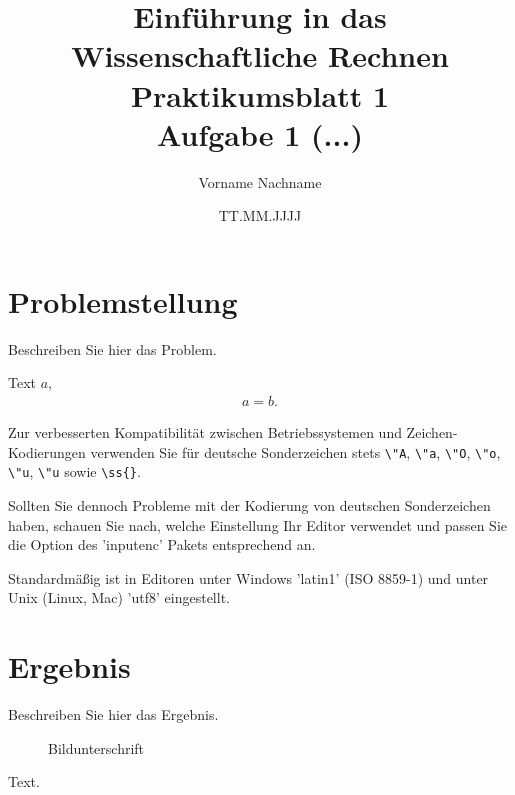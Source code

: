 \documentclass[11pt,a4paper]{article}
\title{Einf\"uhrung in das Wissenschaftliche Rechnen\\
  Praktikumsblatt 1\\
  Aufgabe 1 (...)}
\author{Vorname Nachname}
\date{TT.MM.JJJJ}
\begin{document}
  
  \maketitle
  
  \section*{Problemstellung}
  Beschreiben Sie hier das Problem.
  
  Text $a$,
  \begin{align*}
    a = b.
  \end{align*}
  
  Zur verbesserten Kompatibilit\"at zwischen Betriebssystemen und
  Zeichen-Kodierungen verwenden Sie f\"ur deutsche Sonderzeichen stets
  \verb+\"A+, \verb+\"a+, \verb+\"O+, \verb+\"o+, \verb+\"u+, \verb+\"u+
  sowie \verb+\ss{}+.
  
  Sollten Sie dennoch Probleme mit der Kodierung von deutschen Sonderzeichen
  haben, schauen Sie nach, welche Einstellung Ihr Editor verwendet und passen
  Sie die Option des 'inputenc' Pakets entsprechend an.
  
  Standardm\"a\ss{}ig ist in Editoren unter Windows 'latin1' (ISO 8859-1) und
  unter Unix (Linux, Mac) 'utf8' eingestellt.
  
  
  
  \section*{Ergebnis}
  
  Beschreiben Sie hier das Ergebnis.
  
  \begin{figure}[ht]
    \centering
    \caption{Bildunterschrift}
  \end{figure}
  
  Text.
  
\end{document}

